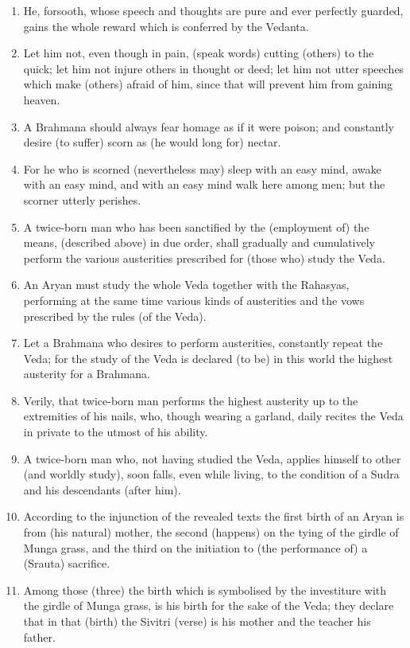 \begin{enumerate}
\item He, forsooth, whose speech and thoughts are pure and ever perfectly guarded, gains the whole reward which is conferred by the Vedanta.
\item Let him not, even though in pain, (speak words) cutting (others) to the quick; let him not injure others in thought or deed; let him not utter speeches which make (others) afraid of him, since that will prevent him from gaining heaven.
\item A Brahmana should always fear homage as if it were poison; and constantly desire (to suffer) scorn as (he would long for) nectar.
\item For he who is scorned (nevertheless may) sleep with an easy mind, awake with an easy mind, and with an easy mind walk here among men; but the scorner utterly perishes.
\item A twice-born man who has been sanctified by the (employment of) the means, (described above) in due order, shall gradually and cumulatively perform the various austerities prescribed for (those who) study the Veda.
\item An Aryan must study the whole Veda together with the Rahasyas, performing at the same time various kinds of austerities and the vows prescribed by the rules (of the Veda).
\item Let a Brahmana who desires to perform austerities, constantly repeat the Veda; for the study of the Veda is declared (to be) in this world the highest austerity for a Brahmana.
\item Verily, that twice-born man performs the highest austerity up to the extremities of his nails, who, though wearing a garland, daily recites the Veda in private to the utmost of his ability.
\item A twice-born man who, not having studied the Veda, applies himself to other (and worldly study), soon falls, even while living, to the condition of a Sudra and his descendants (after him).
\item According to the injunction of the revealed texts the first birth of an Aryan is from (his natural) mother, the second (happens) on the tying of the girdle of Munga grass, and the third on the initiation to (the performance of) a (Srauta) sacrifice.
\item Among those (three) the birth which is symbolised by the investiture with the girdle of Munga grass, is his birth for the sake of the Veda; they declare that in that (birth) the Sivitri (verse) is his mother and the teacher his father.

\end{enumerate}
